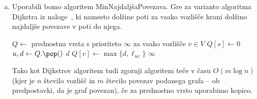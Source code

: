 \begin{naloga}
\begin{odgovor}
\begin{enumerate}[(a)]
\item Uporabili bomo algoritem {\sc MinNajdaljšaPovezava}.
Gre za varianto algoritma {\sc Dijkstra} iz naloge~\res[dijkstra],
ki namesto dolžine poti za vsako vozlišče
hrani dolžino najdaljše povezave v poti do njega.
\begin{small}
\begin{algorithmic}
	\State $Q \gets$ prednostna vrsta
        s prioriteto $\infty$ za vsako vozlišče $v \in V$
	\State $Q[s] \gets 0$
		\State $u, d \gets Q.\pop()$
            \State \Return $d$
        \EndIf
				\State $Q[v] \gets \max\{d, \ell_{uv}\}$
			\EndIf
		\EndFor
	\EndWhile
    \State \Return $\infty$
\EndFunction
\end{algorithmic}
\end{small}
Tako kot Dijkstrov algoritem
tudi zgornji algoritem teče v času $O(m \log n)$
(kjer je $n$ število vozlišč in $m$ število povezav podanega grafa
-- ob predpostavki, da je graf povezan),
če za prednostno vrsto uporabimo kopico.
\end{enumerate}
\end{odgovor}
\end{naloga}
